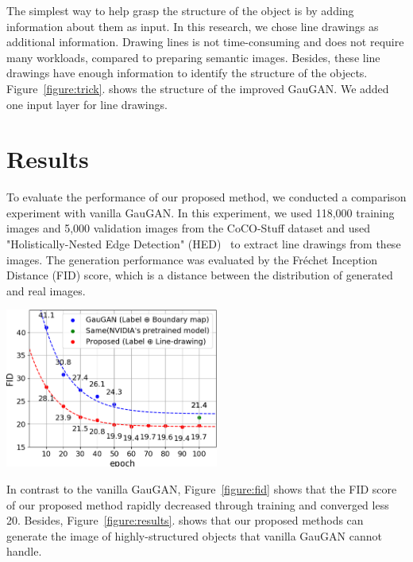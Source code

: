 \documentclass[a4paper]{article}
\newenvironment{Figure}
  {\par\medskip\noindent\minipage{\linewidth}}
  {\endminipage\par\medskip}
\newcommand{\aftersection}{\vspace{-5pt}}
\newcommand{\beforesection}{\vspace{-10pt}}
\newcommand{\beforecaption}{\vspace{-10pt}}
\begin{document}
\begin{multicols}{2}
The simplest way to help grasp the structure of the object is by adding information about them as input.
In this research, we chose line drawings as additional information. Drawing lines is not time-consuming and does not require many workloads, compared to preparing semantic images. Besides, these line drawings have enough information to identify the structure of the objects.
Figure~\ref{figure:trick}. shows the structure of the improved GauGAN. We added one input layer for line drawings. 

\beforesection
\section*{Results}
\aftersection

To evaluate the performance of our proposed method, we conducted a comparison experiment with vanilla GauGAN. In this experiment, we used 118,000 training images and 5,000 validation images from the CoCO-Stuff dataset and used "Holistically-Nested Edge Detection" (HED)~\cite{hed} to extract line drawings from these images.  The generation performance was evaluated by the Fréchet Inception Distance (FID) score, which is a distance between the distribution of generated and real images.

\begin{Figure}
\begin{center}
\includegraphics[width=70mm]{fid5.png}
\beforecaption
{}
\label{figure:fid}
\end{center}
\end{Figure}

In contrast to the vanilla GauGAN, Figure~\ref{figure:fid} shows that the FID score of our proposed method rapidly decreased through training and converged less 20.
Besides, Figure~\ref{figure:results}. shows that our proposed methods can generate the image of highly-structured objects that vanilla GauGAN cannot handle.


\end{multicols}
\end{document}
